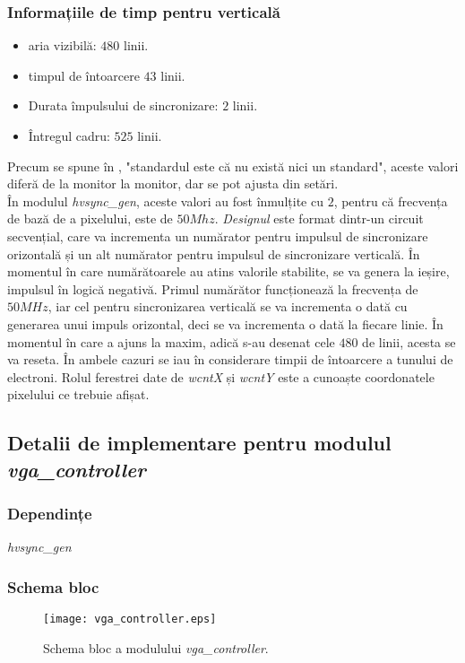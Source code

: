 \documentclass[12pt,twoside,a4paper,fleqn]{book}
\theoremstyle{definition}
\begin{document}
\subsubsection{Informațiile de timp pentru verticală}
\begin{itemize}
\item aria vizibilă: $480$ linii.
\item timpul de întoarcere $43$ linii.
\item Durata împulsului de sincronizare: $2$ linii.
\item Întregul cadru: $525$ linii.
\end{itemize}

Precum se spune în \cite{epanorama}, "standardul este că nu există nici un standard", aceste valori diferă de la monitor la monitor, dar se pot ajusta din setări.\\
În modulul \emph{hvsync\_gen}, aceste valori au fost înmulțite cu $2$, pentru că frecvența de bază de a pixelului, este de $50Mhz$. \emph{Designul} este format dintr-un circuit secvențial, care va incrementa un numărator pentru impulsul de sincronizare orizontală și un alt numărator pentru impulsul de sincronizare verticală. În momentul în care numărătoarele au atins valorile stabilite, se va genera la ieșire, impulsul în logică negativă. Primul numărător funcționează la frecvența de $50MHz$, iar cel pentru sincronizarea verticală se va incrementa o dată cu generarea unui impuls orizontal, deci se va incrementa o dată la fiecare linie. În momentul în care a ajuns la maxim, adică s-au desenat cele $480$ de linii, acesta se va reseta. În ambele cazuri se iau în considerare timpii de întoarcere a tunului de electroni. Rolul ferestrei date de \emph{wcntX} și \emph{wcntY} este a cunoaște coordonatele pixelului ce trebuie afișat.

\subsection{Detalii de implementare pentru modulul \emph{vga\_controller}}

\subsubsection{Dependințe}
\emph{hvsync\_gen}

\subsubsection{Schema bloc}
\begin{figure}[h]
\texttt{[image: vga\_controller.eps]}
\caption{\small{Schema bloc a modulului \emph{vga\_controller}.}}
\label{fig:fig_vga_controller}
\end{figure}
\end{document}
